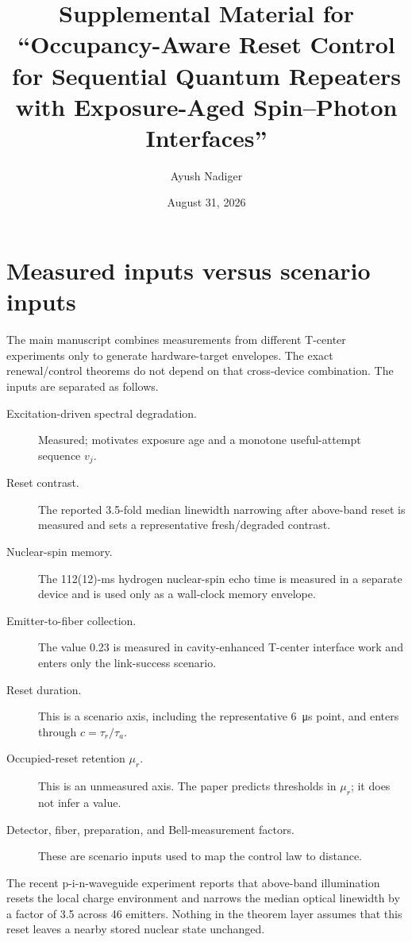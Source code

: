 \documentclass[aps,prx,preprint,superscriptaddress,nofootinbib,longbibliography]{revtex4-2}
\begin{document}
\title{Supplemental Material for ``Occupancy-Aware Reset Control for Sequential Quantum Repeaters with Exposure-Aged Spin--Photon Interfaces''}
\author{Ayush Nadiger}
\date{August 31, 2026}
\maketitle

\section{Measured inputs versus scenario inputs}
The main manuscript combines measurements from different T-center experiments only to generate hardware-target envelopes. The exact renewal/control theorems do not depend on that cross-device combination. The inputs are separated as follows.

\begin{description}
\item[Excitation-driven spectral degradation.] Measured; motivates exposure age and a monotone useful-attempt sequence $v_j$.
\item[Reset contrast.] The reported 3.5-fold median linewidth narrowing after above-band reset is measured and sets a representative fresh/degraded contrast.
\item[Nuclear-spin memory.] The 112(12)-ms hydrogen nuclear-spin echo time is measured in a separate device and is used only as a wall-clock memory envelope.
\item[Emitter-to-fiber collection.] The value 0.23 is measured in cavity-enhanced T-center interface work and enters only the link-success scenario.
\item[Reset duration.] This is a scenario axis, including the representative \SI{6}{\micro s} point, and enters through $c=\tau_r/\tau_a$.
\item[Occupied-reset retention $\mu_r$.] This is an unmeasured axis. The paper predicts thresholds in $\mu_r$; it does not infer a value.
\item[Detector, fiber, preparation, and Bell-measurement factors.] These are scenario inputs used to map the control law to distance.
\end{description}
The recent p-i-n-waveguide experiment reports that above-band illumination resets the local charge environment and narrows the median optical linewidth by a factor of 3.5 across 46 emitters. Nothing in the theorem layer assumes that this reset leaves a nearby stored nuclear state unchanged.
\end{document}
